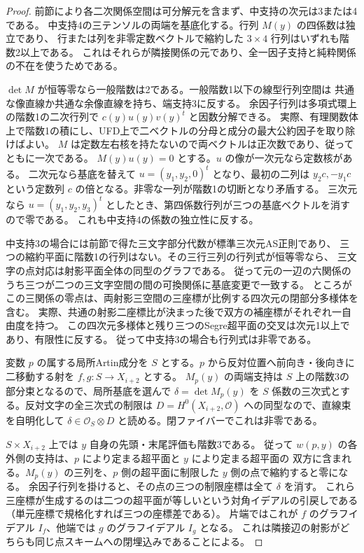 \begin{proof}
前節により各二次関係空間は可分解元を含まず、中支持の次元は3または4である。
中支持4の三テンソルの両端を基底化する。行列 $M(y)$ の四係数は独立であり、
行または列を非零定数ベクトルで縮約した $3\times4$ 行列はいずれも階数2以上である。
これはそれらが隣接関係の元であり、全一因子支持と純粋関係の不在を使うためである。

$\det M$ が恒等零なら一般階数は2である。一般階数1以下の線型行列空間は
共通な像直線か共通な余像直線を持ち、端支持3に反する。
余因子行列は多項式環上の階数1の二次行列で $c(y)u(y)v(y)^t$ と因数分解できる。
実際、有理関数体上で階数1の積にし、UFD上で二ベクトルの分母と成分の最大公約因子を取り除けばよい。
$M$ は定数左右核を持たないので両ベクトルは正次数であり、従ってともに一次である。
$M(y)u(y)=0$ とする。$u$ の像が一次元なら定数核がある。
二次元なら基底を替えて $u=(y_1,y_2,0)^t$ となり、最初の二列は $y_2 c,-y_1 c$
という定数列 $c$ の倍となる。非零な一列が階数1の切断となり矛盾する。
三次元なら $u=(y_1,y_2,y_3)^t$ としたとき、第四係数行列が三つの基底ベクトルを消すので零である。
これも中支持4の係数の独立性に反する。

中支持3の場合には前節で得た三文字部分代数が標準三次元AS正則であり、
三つの縮約平面に階数1の行列はない。その三行三列の行列式が恒等零なら、
三文字の点対応は射影平面全体の同型のグラフである。
従って元の一辺の六関係のうち三つが二つの三文字空間の間の可換関係に基底変更で一致する。
ところがこの三関係の零点は、両射影三空間の三座標が比例する四次元の閉部分多様体を含む。
実際、共通の射影二座標比が決まった後で双方の補座標がそれぞれ一自由度を持つ。
この四次元多様体と残り三つのSegre超平面の交叉は次元1以上であり、有限性に反する。
従って中支持3の場合も行列式は非零である。

変数 $p$ の属する局所Artin成分を $S$ とする。$p$ から反対位置へ前向き・後向きに
二移動する射を $f,g:S\to X_{i+2}$ とする。
$M_p(y)$ の両端支持は $S$ 上の階数3の部分束となるので、局所基底を選んで
$\delta=\det M_p(y)$ を $S$ 係数の三次式とする。反対文字の全三次式の制限は
$D=H^0(X_{i+2},\mathcal O)$ への同型なので、直線束を自明化して
$\delta\in\mathcal O_S\otimes D$ と読める。閉ファイバーでこれは非零である。

$S\times X_{i+2}$ 上では $y$ 自身の先頭・末尾評価も階数3である。
従って $w(p,y)$ の各外側の支持は、$p$ により定まる超平面と $y$ により定まる超平面の
双方に含まれる。$M_p(y)$ の三列を、$p$ 側の超平面に制限した $y$ 側の点で縮約すると零になる。
余因子行列を掛けると、その点の三つの制限座標は全て $\delta$ を消す。
これら三座標が生成するのは二つの超平面が等しいという対角イデアルの引戻しである
（単元座標で規格化すれば三つの座標差である）。
片端ではこれが $f$ のグラフイデアル $I_f$、他端では $g$ のグラフイデアル $I_g$ となる。
これは隣接辺の射影がどちらも同じ点スキームへの閉埋込みであることによる。


\end{proof}
